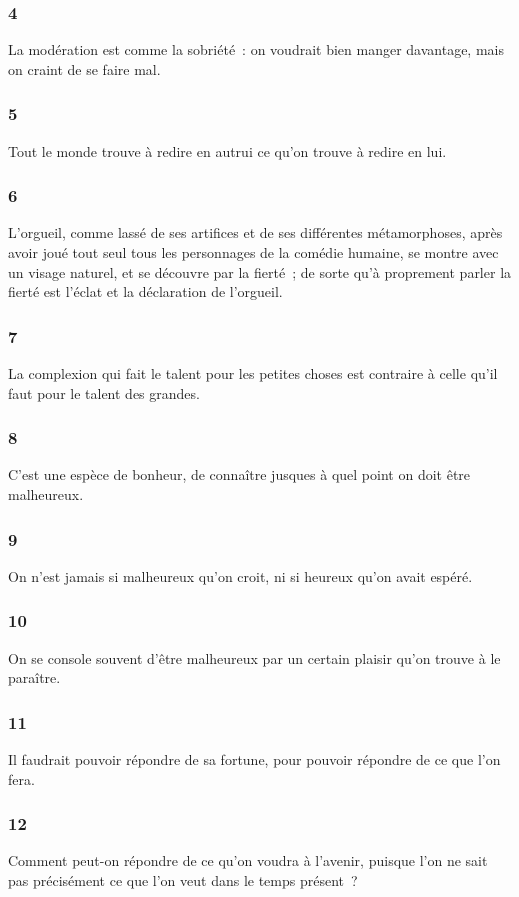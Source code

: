 \documentclass[french,twoside]{book} %
\begin{document}
\subsubsection[{4}]{ \textsc{4} }
\noindent La modération est comme la sobriété : on voudrait bien manger davantage, mais on craint de se faire mal.
\subsubsection[{5}]{ \textsc{5} }
\noindent Tout le monde trouve à redire en autrui ce qu’on trouve à redire en lui.
\subsubsection[{6}]{ \textsc{6} }
\noindent L’orgueil, comme lassé de ses artifices et de ses différentes métamorphoses, après avoir joué tout seul tous les personnages de la comédie humaine, se montre avec un visage naturel, et se découvre par la fierté ; de sorte qu’à proprement parler la fierté est l’éclat et la déclaration de l’orgueil.
\subsubsection[{7}]{ \textsc{7} }
\noindent La complexion qui fait le talent pour les petites choses est contraire à celle qu’il faut pour le talent des grandes.
\subsubsection[{8}]{ \textsc{8} }
\noindent C’est une espèce de bonheur, de connaître jusques à quel point on doit être malheureux.
\subsubsection[{9}]{ \textsc{9} }
\noindent On n’est jamais si malheureux qu’on croit, ni si heureux qu’on avait espéré.
\subsubsection[{10}]{ \textsc{10} }
\noindent On se console souvent d’être malheureux par un certain plaisir qu’on trouve à le paraître.
\subsubsection[{11}]{ \textsc{11} }
\noindent Il faudrait pouvoir répondre de sa fortune, pour pouvoir répondre de ce que l’on fera.
\subsubsection[{12}]{ \textsc{12} }
\noindent Comment peut-on répondre de ce qu’on voudra à l’avenir, puisque l’on ne sait pas précisément ce que l’on veut dans le temps présent ?
\end{document}
